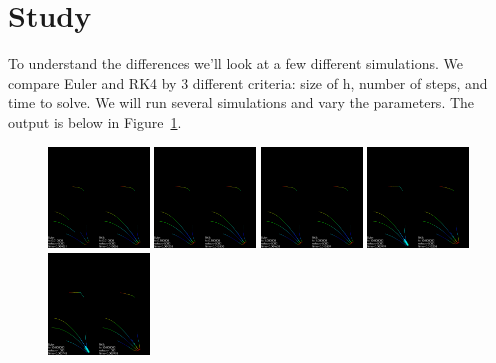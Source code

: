 \documentclass[12pt,letter]{article}
\begin{document}
\section{Study}
To understand the differences we'll look at a few different simulations. We
compare Euler and RK4 by 3 different criteria: size of h, number of steps, and
time to solve. We will run several simulations and vary the parameters. The
output is below in Figure~\ref{fig:compare}.

\FloatBarrier
\begin{figure}[ht]
    \label{fig:compare}
    \begin{center}
    \includegraphics[width=0.24\textwidth]{imgs/h0p01.png}
    \includegraphics[width=0.24\textwidth]{imgs/h0p1.png}
    \includegraphics[width=0.24\textwidth]{imgs/h1p0.png}
    \includegraphics[width=0.24\textwidth]{imgs/h10p0.png}
    \\
    \includegraphics[width=0.24\textwidth]{imgs/h10n1000.png}

\end{center}
\end{figure}
\end{document}
